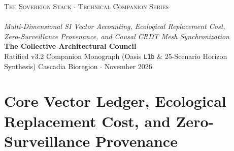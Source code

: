 \documentclass[11pt,a4paper]{book}
\DeclareRobustCommand{\_}{\ifmmode\text{\symbol{95}}\else\symbol{95}\allowbreak\fi}
\theoremstyle{plain}
\theoremstyle{definition}
\begin{document}
\frontmatter
\begin{titlepage}
    \thispagestyle{empty}
    \begin{center}
        \vspace*{3.0cm}
        {\Large \textsc{The Sovereign Stack $\cdot$ Technical Companion Series}} \\[1.1cm]
        {} \\[0.85cm]
        {\Large \textit{Multi-Dimensional SI Vector Accounting, Ecological Replacement Cost,}} \\[0.25cm]
        {\Large \textit{Zero-Surveillance Provenance, and Causal CRDT Mesh Synchronization}} \\[2.4cm]
        {\large \textbf{The Collective Architectural Council}} \\[0.4cm]
        {\normalsize Ratified v3.2 Companion Monograph (Oasis \texttt{L1b} \& 25-Scenario Horizon Synthesis)}
        \vfill
        {\large Cascadia Bioregion $\cdot$ November 2026}
        \vspace*{2.0cm}
    \end{center}
    \clearpage
\end{titlepage}

\tableofcontents



\mainmatter

\part{Core Vector Ledger, Ecological Replacement Cost, and Zero-Surveillance Provenance}











\end{document}

